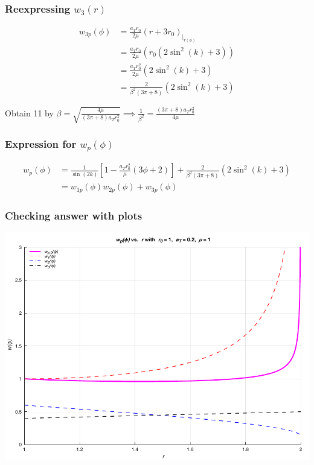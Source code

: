 \documentclass{beamer}
\begin{document}
\begin{frame}
    \frametitle{Reexpressing $w_3(r)$}

    \begin{align}
        w_{3p}(\phi)&=\frac{a_Tr_0}{2\mu}(r+3r_0)_{\big\rvert_{r(\phi)}}\\
        &=\frac{a_Tr_0}{2\mu}(r_0(2\sin^2(k)+3))\\
        &=\frac{a_Tr_0^2}{2\mu}(2\sin^2(k)+3)\\
        &=\frac{2}{\beta^2(3\pi+8)}(2\sin^2(k)+3)
    \end{align}

    Obtain 11 by $\beta=\sqrt{\frac{4\mu}{(3\pi+8)a_Tr_0^2}}\implies \frac{1}{\beta^2}=\frac{(3\pi+8)a_Tr_0^2}{4\mu}$
\end{frame}

\begin{frame}
    \frametitle{Expression for $w_p(\phi)$}

    \begin{align}
        w_p(\phi)&=\frac{1}{\sin(2k)}\left[1-\frac{a_Tr_0^2}{\mu}\left(3\phi+2\right)\right]+\frac{2}{\beta^2(3\pi+8)}(2\sin^2(k)+3)\\ %
        &=w_{1p}(\phi)w_{2p}(\phi)+w_{3p}(\phi)
    \end{align}
\end{frame}

\begin{frame}
    \frametitle{Checking answer with plots}

    \begin{center}
        \includegraphics[scale=0.7]{plots/partA_phi.pdf}
    \end{center}
\end{frame}
\end{document}
